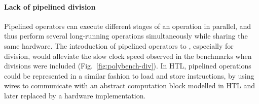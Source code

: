 

\paragraph{Lack of pipelined division}
Pipelined operators can execute different stages of an operation in parallel, and thus perform several long-running operations simultaneously while sharing the same hardware.
The introduction of pipelined operators to \vericert{}, especially for division, would alleviate the slow clock speed observed in the \polybench{} benchmarks when divisions were included (Fig.~\ref{fig:polybench-div}). In HTL, pipelined operations could be represented in a similar fashion to load and store instructions, by using wires to communicate with an abstract computation block modelled in HTL and later replaced by a hardware implementation.

